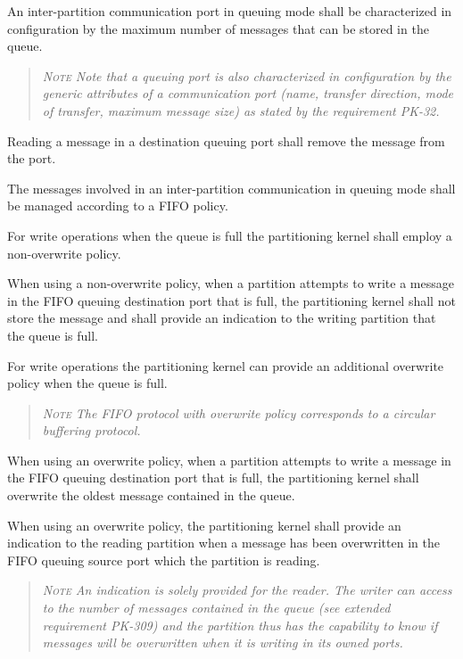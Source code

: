 An inter-partition communication port in queuing mode shall be characterized in configuration by the maximum number of messages that can be stored in the queue.
\begin{quote}\it
\textsc{Note}
Note that a queuing port is also characterized in configuration by the generic attributes of a communication port (name, transfer direction, mode of transfer, maximum message size)  as stated by the requirement PK-32.
\end{quote}

Reading a message in a destination queuing port shall remove the message from the port.

The messages involved in an inter-partition communication in queuing mode shall be managed according to a FIFO policy.

For write operations when the queue is full the partitioning kernel shall employ a non-overwrite policy.

When using a non-overwrite policy, when a partition attempts to write a message in the FIFO queuing destination port that is full, the partitioning kernel shall not store the message and shall provide an indication to the writing  partition that the queue is full.

For write operations the partitioning kernel can provide an additional overwrite policy when the queue is full.
\begin{quote}\it
\textsc{Note}
The FIFO protocol with overwrite policy corresponds to a circular buffering protocol.
\end{quote}

When using an overwrite policy, when a partition attempts to write a message in the FIFO queuing destination port that is full, the partitioning kernel shall overwrite the oldest message contained in the queue.

When using an overwrite policy, the partitioning kernel shall provide an indication to the reading partition when a message has been overwritten in the FIFO queuing source port which the partition is reading.
\begin{quote}\it
\textsc{Note}
An indication is solely provided for the reader. The writer can access to the number of messages contained in the queue (see extended requirement PK-309) and the partition thus has the capability to know if messages will be overwritten when it is writing in its owned ports.
\end{quote}

